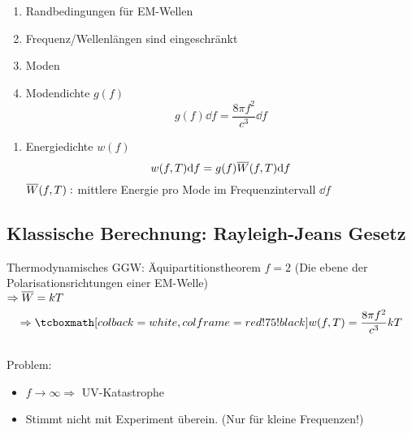 \begin{minipage}{.6\linewidth}
	\begin{enumerate}[$ \Rightarrow $]
		\item Randbedingungen für EM-Wellen
		\item Frequenz/Wellenlängen sind eingeschränkt
		\item Moden
		\item Modendichte $ g(f) $
		\begin{equation*}
		g(f) \dd f = \frac{ 8 \pi f^2 }{c^3} \dd f
		\end{equation*}
	\end{enumerate}
\end{minipage}%
\begin{minipage}{.4\linewidth}
	\flushright
\end{minipage}%
\begin{enumerate}[$ \Rightarrow $]
	\item Energiedichte $ w(f) $
	\begin{equation*}
	w(f,T) \textrm{d} f = g(f) \overline{W}(f,T) \textrm{d} f
	\end{equation*}
	$ \overline{W}(f,T) : $ mittlere Energie pro Mode im Frequenzintervall $ \dd f $
\end{enumerate}

\subsection{Klassische Berechnung: Rayleigh-Jeans Gesetz}

Thermodynamisches GGW: Äquipartitionstheorem $ f = 2 $ (Die ebene der Polarisationsrichtungen einer EM-Welle)\\[5pt]
$ \Rightarrow \overline{W} = k T $
\begin{equation*}
\Rightarrow \rmbox{w(f,T) = \frac{8 \pi f^2}{c^3} k T}
\end{equation*}
\\
Problem:
\begin{itemize}
	\item $ f \to \infty \Rightarrow $ UV-Katastrophe
	\item Stimmt nicht mit Experiment überein. (Nur für kleine Frequenzen!)
\end{itemize}

